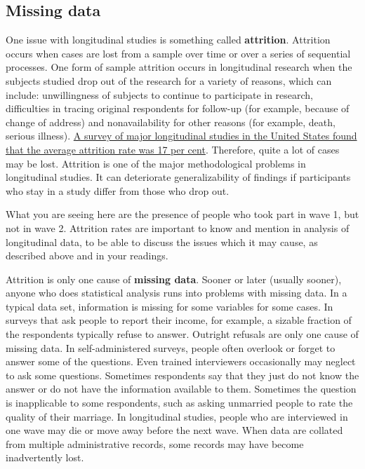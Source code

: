 \documentclass[
]{book}
\begin{document}
\hypertarget{missing-data}{%
\subsection{Missing data}\label{missing-data}}

One issue with longitudinal studies is something called \textbf{attrition}. Attrition occurs when cases are lost from a sample over time or over a series of sequential processes. One form of sample attrition occurs in longitudinal research when the subjects studied drop out of the research for a variety of reasons, which can include: unwillingness of subjects to continue to participate in research, difficulties in tracing original respondents for follow-up (for example, because of change of address) and nonavailability for other reasons (for example, death, serious illness). \href{http://methods.sagepub.com/reference/the-sage-dictionary-of-social-research-methods/n9.xml}{A survey of major longitudinal studies in the United States found that the average attrition rate was 17 per cent}. Therefore, quite a lot of cases may be lost. Attrition is one of the major methodological problems in longitudinal studies. It can deteriorate generalizability of findings if participants who stay in a study differ from those who drop out.

What you are seeing here are the presence of people who took part in wave 1, but not in wave 2. Attrition rates are important to know and mention in analysis of longitudinal data, to be able to discuss the issues which it may cause, as described above and in your readings.

Attrition is only one cause of \textbf{missing data}. Sooner or later (usually sooner), anyone who does statistical analysis runs into problems with missing data. In a typical data set, information is missing for some variables for some cases. In surveys that ask people to report their income, for example, a sizable fraction of the respondents typically refuse to answer. Outright refusals are only one cause of missing data. In self-administered surveys, people often overlook or forget to answer some of the questions. Even trained interviewers occasionally may neglect to ask some questions. Sometimes respondents say that they just do not know the answer or do not have the information available to them. Sometimes the question is inapplicable to some respondents, such as asking unmarried people to rate the quality of their marriage. In longitudinal studies, people who are interviewed in one wave may die or move away before the next wave. When data are collated from multiple administrative records, some records may have become inadvertently lost.
\end{document}
